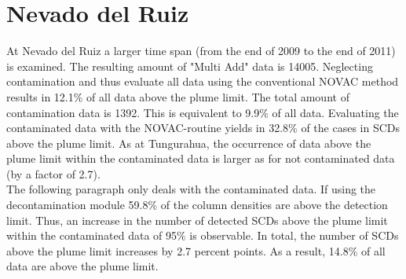 \documentclass  [
  paper    = a4,
  BCOR     = 10mm,
  twoside,
  fontsize = 12pt,
  fleqn,
  toc      = bibnumbered,
  toc      = listofnumbered,
  numbers  = noendperiod,
  headings = normal,
  listof   = leveldown,
  version  = 3.03
]                                       {scrreprt}
\begin{document}
\section{Nevado del Ruiz}
At Nevado del Ruiz a larger time span (from the end of 2009 to the end of 2011) is examined. The resulting amount of "Multi Add" data is 14005.
Neglecting contamination and thus evaluate all data using the conventional NOVAC method results in 12.1\% of all data above the plume limit. 
The total amount of contamination data is 1392. This is equivalent to 9.9\% of all data. Evaluating the contaminated data with the NOVAC-routine yields in 32.8\% of the cases in  SCDs above the plume limit. As at Tungurahua, the occurrence of data above the plume limit within the contaminated data is larger as for not contaminated data (by a factor of 2.7).\\
The following paragraph only deals with the contaminated data.
If using the decontamination module 59.8\% of the  column densities are above the detection limit. Thus, an increase in the number of detected  SCDs above the plume limit within the contaminated data of 95\% is observable. In total, the number of  SCDs above the plume limit increases by 2.7 percent points. As a result, 14.8\% of all data are above the plume limit.\\
\FloatBarrier


%
%
%
\end{document}
